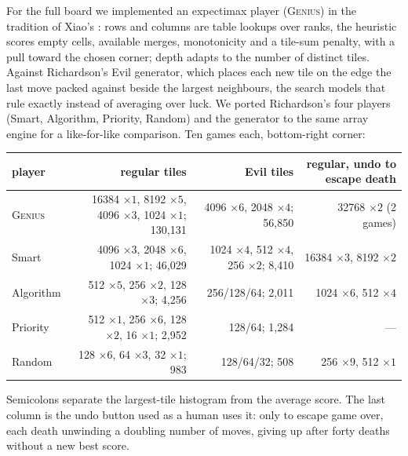 \documentclass[11pt]{article}
\theoremstyle{definition}
\theoremstyle{remark}
\begin{document}
For the full board we implemented an expectimax player (\textsc{Genius})
in the tradition of Xiao's \cite{nneonneo2014}: rows and columns are
table lookups over ranks, the heuristic scores empty cells, available
merges, monotonicity and a tile-sum penalty, with a pull toward the chosen
corner; depth adapts to the number of distinct tiles. Against Richardson's
\cite{richardson2014} Evil generator, which places each new tile on the
edge the last move packed against beside the largest neighbours, the
search models that rule exactly instead of averaging over luck. We ported
Richardson's four players (Smart, Algorithm, Priority, Random) and the
generator to the same array engine for a like-for-like comparison. Ten
games each, bottom-right corner:

\begin{center}\scriptsize\setlength{\tabcolsep}{3pt}
\begin{tabular}{@{}lrrr@{}}
\toprule
player & regular tiles & Evil tiles & regular, undo to escape death \\
\midrule
\textsc{Genius} & 16384 $\times1$, 8192 $\times5$, 4096 $\times3$, 1024 $\times1$; 130{,}131 & 4096 $\times6$, 2048 $\times4$; 56{,}850 & 32768 $\times2$ (2 games) \\
Smart & 4096 $\times3$, 2048 $\times6$, 1024 $\times1$; 46{,}029 & 1024 $\times4$, 512 $\times4$, 256 $\times2$; 8{,}410 & 16384 $\times3$, 8192 $\times2$ \\
Algorithm & 512 $\times5$, 256 $\times2$, 128 $\times3$; 4{,}256 & 256/128/64; 2{,}011 & 1024 $\times6$, 512 $\times4$ \\
Priority & 512 $\times1$, 256 $\times6$, 128 $\times2$, 16 $\times1$; 2{,}952 & 128/64; 1{,}284 & --- \\
Random & 128 $\times6$, 64 $\times3$, 32 $\times1$; 983 & 128/64/32; 508 & 256 $\times9$, 512 $\times1$ \\
\bottomrule
\end{tabular}
\end{center}

Semicolons separate the largest-tile histogram from the average score. The
last column is the undo button used as a human uses it: only to escape
game over, each death unwinding a doubling number of moves, giving up
after forty deaths without a new best score.
\end{document}
